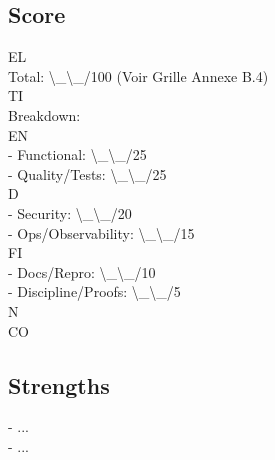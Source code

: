 \subsection*{Score}
\vspace{0.5em}
\vspace{0.5em}
\vspace{0.5em}
\vspace{0.5em}
EL\\
Total: \textbackslash{}_\textbackslash{}_/100 (Voir Grille Annexe B.4)\\
\vspace{0.5em}
\vspace{0.5em}
\vspace{0.5em}
\vspace{0.5em}
TI\\
Breakdown:\\
\vspace{0.5em}
\vspace{0.5em}
\vspace{0.5em}
\vspace{0.5em}
EN\\
- Functional:        \textbackslash{}_\textbackslash{}_/25\\
- Quality/Tests:     \textbackslash{}_\textbackslash{}_/25\\
\vspace{0.5em}
\vspace{0.5em}
\vspace{0.5em}
\vspace{0.5em}
D\\
- Security:          \textbackslash{}_\textbackslash{}_/20\\
- Ops/Observability: \textbackslash{}_\textbackslash{}_/15\\
\vspace{0.5em}
\vspace{0.5em}
\vspace{0.5em}
\vspace{0.5em}
FI\\
- Docs/Repro:        \textbackslash{}_\textbackslash{}_/10\\
- Discipline/Proofs: \textbackslash{}_\textbackslash{}_/5\\
N\\
CO\\
\subsection*{Strengths}
- ...\\
- ...\\
\vspace{0.5em}
\vspace{0.5em}
